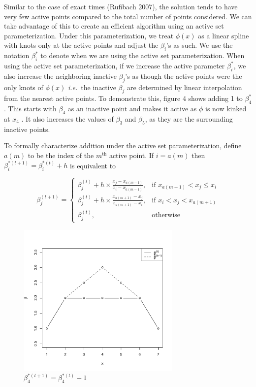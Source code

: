 \documentclass[10pt]{article}
\begin{document}
	Similar to the case of exact times (Rufibach 2007), the solution tends to have very few active points compared to the total number of points considered. We can take advantage of this to create an efficient algorithm using an active set parameterization. Under this parameterization, we treat $\phi(x)$ as a linear spline with knots only at the active points and adjust the $\beta_i$'s as such. We use the notation $\beta_i^*$ to denote when we are using the active set parameterization. When using the active set parameterization, if we increase the active parameter $ \beta_i^*$, we also increase the neighboring inactive $\beta_j$'s as though the active points were the only knots of $\phi(x)$  \emph{i.e.}\ the inactive $\beta_j$ are determined by linear interpolation from the nearest active points. To demonstrate this, figure 4 shows adding 1 to $\beta_4^*$. This starts with $\beta_4$ as an inactive point and makes it active as $\phi$ is now kinked at $x_4$ . It also increases the values of $\beta_3$ and $\beta_5$, as they are the surrounding inactive points.  
	
	To formally characterize addition under the active set parameterization, define $a(m)$ to be the index of the $m^{\mathrm{th} } $ active point. If $i = a(m)$ then $\beta_i^{*(t+1)} = \beta_i^{*(t)} + h$ is equivalent to 
		
	\[
	\beta^{(t+1)}_j = 
	\begin{cases}
		\beta^{(t)}_j + h \times \frac{x_j - x_{a(m-1)} } {x_{i} - x_{a(m-1)} } , & \text{if } x_{a(m-1)} < x_j  \leq x_{i} \\ 
		\beta^{(t)}_j + h \times \frac{x_{a(m+1)} - x_j} {x_{a(m+1)} - x_{i} }, & \text{if } x_{ i} < x_j < x_{a(m+1)} \\ 
		\beta^{(t)}_j, & \text{otherwise}
	\end{cases}
	\]

	
\begin{figure}[h]
\centerline{\includegraphics[width = 8cm]{ActivePoint.pdf}}
\caption[Active Set Parameterization: Log-concave]{$\beta_4^{*(t+1)} = \beta_4^{*(t) }+1$}
\end{figure}		
		
\end{document}
